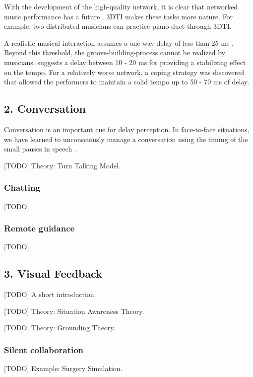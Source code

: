 With the development of the high-quality network, it is clear that networked music performance has a future \cite{carot2007networked}. 3DTI makes these tasks more nature. For example, two distributed musicians can practice piano duet through 3DTI.

A realistic musical interaction assumes a one-way delay of less than 25 ms \cite{carot2007network}. Beyond this threshold, the groove-building-process cannot be realized by musicians. \cite{schuett2002effects} suggests a delay between 10 - 20 ms for providing a stabilizing effect on the tempo. For a relatively worse network, a coping strategy was discovered that allowed the performers to maintain a solid tempo up to 50 - 70 ms of delay.

\subsection{2. Conversation}

Conversation is an important cue for delay perception. In face-to-face situations, we have learned to unconsciously manage a conversation using the timing of the small pauses in speech \cite{sacks1978simplest}.

[TODO] Theory: Turn Talking Model.

\subsubsection{Chatting}

[TODO]

\subsubsection{Remote guidance}

[TODO]

\subsection{3. Visual Feedback}

[TODO] A short introduction.

[TODO] Theory: Situation Awareness Theory.

[TODO] Theory: Grounding Theory.

\subsubsection{Silent collaboration}

[TODO] Example: Surgery Simulation.

